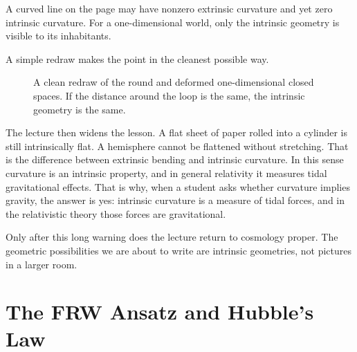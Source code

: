 \begin{remark}
A curved line on the page may have nonzero extrinsic curvature and yet zero intrinsic curvature. For a one-dimensional world, only the intrinsic geometry is visible to its inhabitants.
\end{remark}

A simple redraw makes the point in the cleanest possible way.

\begin{figure}
\centering
{}
\caption{A clean redraw of the round and deformed one-dimensional closed spaces. If the distance around the loop is the same, the intrinsic geometry is the same.}
\end{figure}

The lecture then widens the lesson. A flat sheet of paper rolled into a cylinder is still intrinsically flat. A hemisphere cannot be flattened without stretching. That is the difference between extrinsic bending and intrinsic curvature. In this sense curvature is an intrinsic property, and in general relativity it measures tidal gravitational effects. That is why, when a student asks whether curvature implies gravity, the answer is yes: intrinsic curvature is a measure of tidal forces, and in the relativistic theory those forces are gravitational.

Only after this long warning does the lecture return to cosmology proper. The geometric possibilities we are about to write are intrinsic geometries, not pictures in a larger room.

\section{The FRW Ansatz and Hubble's Law}

